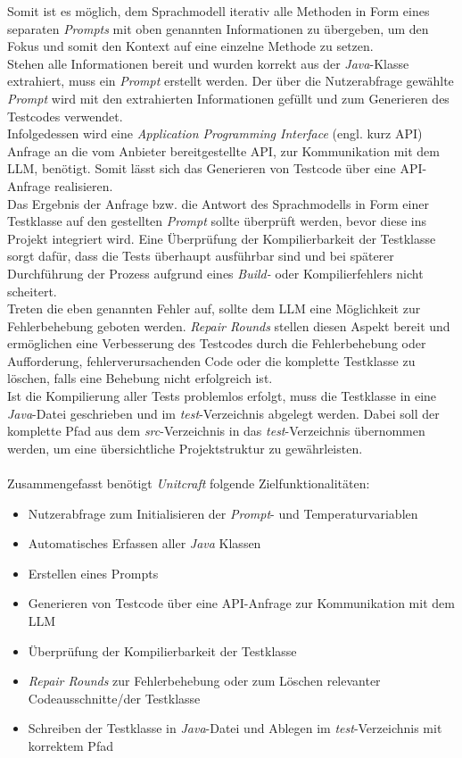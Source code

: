 Somit ist es möglich, dem Sprachmodell iterativ alle Methoden in Form eines separaten \textit{Prompts} mit oben genannten Informationen zu übergeben, um den Fokus und somit den Kontext auf eine einzelne Methode zu setzen. \\ Stehen alle Informationen bereit und wurden korrekt aus der \textit{Java}-Klasse extrahiert, muss ein \textit{Prompt} erstellt werden. Der über die Nutzerabfrage gewählte \textit{Prompt} wird mit den extrahierten Informationen gefüllt und zum Generieren des Testcodes verwendet.\\ Infolgedessen wird eine \textit{Application Programming Interface} (engl. kurz API) Anfrage an die vom Anbieter bereitgestellte \acs{API}, zur Kommunikation mit dem LLM, benötigt. Somit lässt sich das Generieren von Testcode über eine API-Anfrage realisieren.\\ Das Ergebnis der Anfrage bzw. die Antwort des Sprachmodells in Form einer Testklasse auf den gestellten \textit{Prompt} sollte überprüft werden, bevor diese ins Projekt integriert wird. Eine Überprüfung der Kompilierbarkeit der Testklasse sorgt dafür, dass die Tests überhaupt ausführbar sind und bei späterer Durchführung der Prozess aufgrund eines \textit{Build-} oder Kompilierfehlers nicht scheitert.\\ Treten die eben genannten Fehler auf, sollte dem LLM eine Möglichkeit zur Fehlerbehebung geboten werden. \textit{Repair Rounds} stellen diesen Aspekt bereit und ermöglichen eine Verbesserung des Testcodes durch die Fehlerbehebung oder Aufforderung, fehlerverursachenden Code oder die komplette Testklasse zu löschen, falls eine Behebung nicht erfolgreich ist. \\ Ist die Kompilierung aller Tests problemlos erfolgt, muss die Testklasse in eine \textit{Java}-Datei geschrieben und im \textit{test}-Verzeichnis abgelegt werden. Dabei soll der komplette Pfad aus dem \textit{src}-Verzeichnis in das \textit{test}-Verzeichnis übernommen werden, um eine übersichtliche Projektstruktur zu gewährleisten.\\\\Zusammengefasst benötigt \textit{Unitcraft} folgende Zielfunktionalitäten:
\begin{itemize}
    \setlength{\parskip}{1pt}
    \item Nutzerabfrage zum Initialisieren der \textit{Prompt}- und Temperaturvariablen
    \item Automatisches Erfassen aller \textit{Java} Klassen
    \item Erstellen eines Prompts
    \item Generieren von Testcode über eine API-Anfrage zur Kommunikation mit dem LLM
    \item Überprüfung der Kompilierbarkeit der Testklasse
    \item \textit{Repair Rounds} zur Fehlerbehebung oder zum Löschen relevanter Codeausschnitte/der Testklasse
    \item Schreiben der Testklasse in \textit{Java}-Datei und Ablegen im \textit{test}-Verzeichnis mit korrektem Pfad
\end{itemize}
